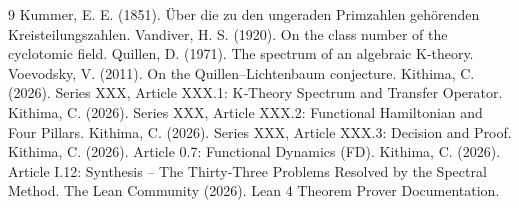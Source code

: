 \documentclass[11pt,a4paper]{article}
\begin{document}

\begin{thebibliography}{9}
  Kummer, E. E. (1851). Über die zu den ungeraden Primzahlen gehörenden Kreisteilungszahlen.
  Vandiver, H. S. (1920). On the class number of the cyclotomic field.
  Quillen, D. (1971). The spectrum of an algebraic K‑theory.
  Voevodsky, V. (2011). On the Quillen–Lichtenbaum conjecture.
  Kithima, C. (2026). Series XXX, Article XXX.1: K‑Theory Spectrum and Transfer Operator.
  Kithima, C. (2026). Series XXX, Article XXX.2: Functional Hamiltonian and Four Pillars.
  Kithima, C. (2026). Series XXX, Article XXX.3: Decision and Proof.
  Kithima, C. (2026). Article 0.7: Functional Dynamics (FD).
  Kithima, C. (2026). Article I.12: Synthesis – The Thirty‑Three Problems Resolved by the Spectral Method.
  The Lean Community (2026). Lean 4 Theorem Prover Documentation.
\end{thebibliography}
\end{document}
